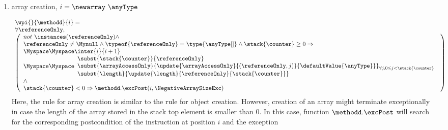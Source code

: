 \begin{itemize}
\begin{enumerate}
		
		\item array creation, $  i =\newarray  \ \anyType $
	
				 $$\begin{array}{l}
                                         \wpi{ } {\methodd}{i}  =  \\
			\forall \referenceOnly,\\
                        \left(\begin{array}{l}    not \ \instances(\referenceOnly) \wedge \\
			   \referenceOnly \neq \Mynull \wedge 
			   \typeof{\referenceOnly} = \type{\anyType[ ]} \wedge 
			  \stack{\counter} \ge 0 \Rightarrow  \\
					 \Myspace     \Myspace  \inter{i}{i+1} \\
                                           \Myspace      \Myspace \begin{array}{l}        
						        \subst{\stack{\counter} }{ \referenceOnly } \\
							\subst{ \arrayAccessOnly }{ \update{\arrayAccessOnly}
                                                                                           {(\referenceOnly, j ) }
                                                                                         {\defaultValue{\anyType} } }_{ { \small \forall j , 0 \leq  j < \stack{\counter} } } \\
                                                          \subst{\length}{\update{\length}{\referenceOnly}{\stack{\counter} } }     
						   \end{array} \\
							\wedge \\
						\stack{\counter} < 0 \Rightarrow    \methodd.\excPost( i, \NegativeArraySizeExc) \\
                         \end{array}\right)
                                    \end{array} $$
		  Here, the rule for array creation is similar to the rule for object creation.
		  However, creation of an array might terminate exceptionally in case the length of the array stored 
		  in the stack top element \stack{\counter} is smaller than $0$. In this case, function $\methodd.\excPost$ will search for the corresponding postcondition 
		  of the instruction at position $i$ and the exception \NegativeArraySizeExc
		

\end{enumerate}
\end{itemize}
